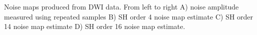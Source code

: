 \label{fig:perSHOrder} Noise maps produced from DWI data. From left to right A) noise amplitude measured using repeated samples B) SH order 4 noise map estimate C) SH order 14 noise map estimate D) SH order 16 noise map estimate.